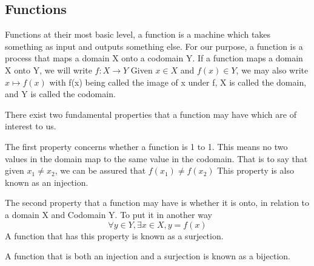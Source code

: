 \subsection{Functions}
Functions at their most basic level, a function is a machine which takes something as input and outputs something else. For our purpose, a function is a process that maps a domain X onto a codomain Y. If a function maps a domain X onto Y, we will write $f:X \rightarrow Y $ \newline
Given $x \in X$ and $f(x) \in Y$, we may also write $x \mapsto f(x)$ with f(x) being called the image of x under f, X is called the domain, and Y is called the codomain.\newline

There exist two fundamental properties that a function may have which are of interest to us.\newline

The first property concerns whether a function is 1 to 1. This means no two values in the domain map to the same value in the codomain. That is to say that given $x_1 \neq x_2$, we can be assured that $f(x_1) \neq f(x_2)$\newline
This property is also known as an injection.\newline

The second property that a function may have is whether it is onto, in relation to a domain X and Codomain Y. To put it in another way $$\forall y \in Y, \exists x \in X, y=f(x)$$
A function that has this property is known as a surjection. \newline

A function that is both an injection and a surjection is known as a bijection. 

